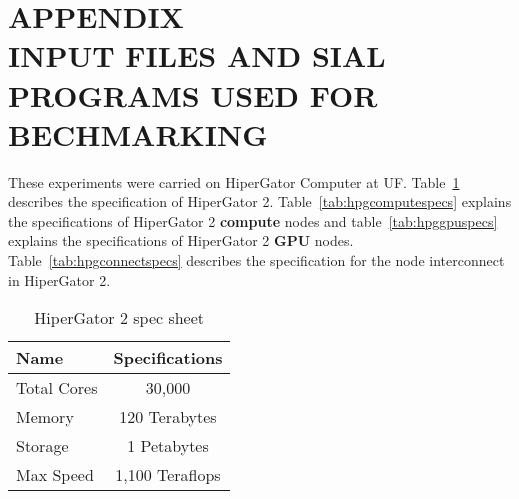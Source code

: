 


\appendix %

\chapter*{APPENDIX \\ INPUT FILES AND SIAL PROGRAMS USED FOR BECHMARKING} %


\setcounter{chapter}{1} %
These experiments were carried on HiperGator Computer at UF. Table~\ref{tab:hpg2spec}
describes the specification of HiperGator 2. Table~\ref{tab:hpgcomputespecs}
explains the specifications of HiperGator 2 \textbf{compute} nodes and
table~\ref{tab:hpggpuspecs} explains the specifications of HiperGator 2 \textbf{GPU}
nodes. Table~\ref{tab:hpgconnectspecs} describes the specification for the
node interconnect in HiperGator 2.

\begin{table}[h]
  \centering
  \caption{HiperGator 2 spec sheet}
  \begin{tabular}{l c}
    \hline
    Name        & Specifications  \\
    \hline
    Total Cores & 30,000          \\
    Memory      & 120 Terabytes   \\
    Storage     & 1 Petabytes     \\
    Max Speed   & 1,100 Teraflops \\
    \hline
  \end{tabular}
  \label{tab:hpg2spec}
\end{table}

